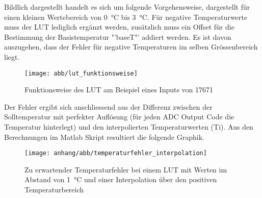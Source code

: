 Bildlich dargestellt handelt es sich um folgende Vorgehensweise, dargestellt für einen kleinen Wertebereich von \SI{0}{\celsius} bis \SI{3}{\celsius}. Für negative Temperaturwerte muss der LUT lediglich ergänzt werden, zusätzlich muss ein Offset für die Bestimmung der Basistemperatur "'baseT"' addiert werden. Es ist davon auszugehen, dass der Fehler für negative Temperaturen im selben Grössenbereich liegt. 
\begin{figure}[H]
	\centering
	\texttt{[image: abb/lut\_funktionsweise]}
	\caption{Funktionsweise des LUT am Beispiel eines Inputs von 17671}
	\label{fig:temperatur_lut_funktionsweise}
\end{figure}
Der Fehler ergibt sich anschliessend aus der Differenz zwischen der Solltemperatur mit perfekter Auflösung (für jeden \ac{ADC} Output Code die Temperatur hinterlegt) und den interpolierten Temperaturwerten (Ti).\lb
Aus den Berechnungen im Matlab Skript resultiert die folgende Graphik. \begin{figure}[H]
	\centering
	\captionsetup{justification=centering}
	\texttt{[image: anhang/abb/temperaturfehler\_interpolation]}
	\caption{Zu erwartender Temperaturfehler bei einem LUT mit Werten im Abstand von \SI{1}{\celsius} und einer Interpolation über den positiven Temperaturbereich}
	\label{fig:temperaturfehler_interpolation_lut}
\end{figure}
